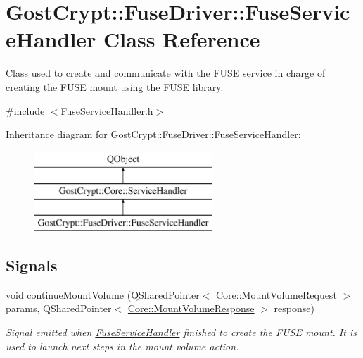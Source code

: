 \hypertarget{class_gost_crypt_1_1_fuse_driver_1_1_fuse_service_handler}{}\section{Gost\+Crypt\+:\+:Fuse\+Driver\+:\+:Fuse\+Service\+Handler Class Reference}
\label{class_gost_crypt_1_1_fuse_driver_1_1_fuse_service_handler}


Class used to create and communicate with the F\+U\+SE service in charge of creating the F\+U\+SE mount using the F\+U\+SE library.  




{\ttfamily \#include $<$Fuse\+Service\+Handler.\+h$>$}

Inheritance diagram for Gost\+Crypt\+:\+:Fuse\+Driver\+:\+:Fuse\+Service\+Handler\+:\begin{figure}[H]
\begin{center}
\leavevmode
\includegraphics[height=3.000000cm]{class_gost_crypt_1_1_fuse_driver_1_1_fuse_service_handler}
\end{center}
\end{figure}
\subsection*{Signals}
\begin{DoxyCompactItemize}
\item 
void \hyperlink{class_gost_crypt_1_1_fuse_driver_1_1_fuse_service_handler_a8d56ee0d6dfa8b61b0a554ab4d1dd60b}{continue\+Mount\+Volume} (Q\+Shared\+Pointer$<$ \hyperlink{struct_gost_crypt_1_1_core_1_1_mount_volume_request}{Core\+::\+Mount\+Volume\+Request} $>$ params, Q\+Shared\+Pointer$<$ \hyperlink{struct_gost_crypt_1_1_core_1_1_mount_volume_response}{Core\+::\+Mount\+Volume\+Response} $>$ response)
\begin{DoxyCompactList}\small\item\em Signal emitted when \hyperlink{class_gost_crypt_1_1_fuse_driver_1_1_fuse_service_handler}{Fuse\+Service\+Handler} finished to create the F\+U\+SE mount. It is used to launch next steps in the mount volume action. \end{DoxyCompactList}\end{DoxyCompactItemize}

